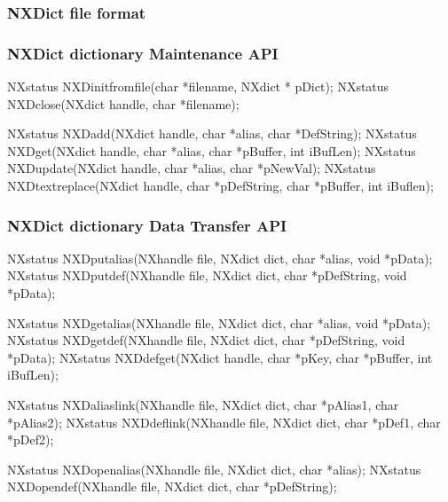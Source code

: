 \documentclass{beamer}
\begin{document}
\begin{frame}[fragile]
 \frametitle{NXDict file format }
\end{frame}


\begin{frame}[fragile]
 \frametitle{NXDict dictionary Maintenance API }
\begin{semiverbatim}
NXstatus NXDinitfromfile(char *filename, NXdict * pDict);
NXstatus NXDclose(NXdict handle, char *filename);

NXstatus NXDadd(NXdict handle, char *alias, char *DefString);
NXstatus NXDget(NXdict handle, char *alias, char *pBuffer, int iBufLen);
NXstatus NXDupdate(NXdict handle, char *alias, char *pNewVal);
NXstatus NXDtextreplace(NXdict handle, char *pDefString, char *pBuffer,
                        int iBuflen);
	
\end{semiverbatim}
\end{frame}



\begin{frame}[fragile]
 \frametitle{NXDict dictionary Data Transfer API }
\begin{semiverbatim}
NXstatus NXDputalias(NXhandle file, NXdict dict, char *alias, void *pData);
NXstatus NXDputdef(NXhandle file, NXdict dict, char *pDefString,
                   void *pData);

NXstatus NXDgetalias(NXhandle file, NXdict dict, char *alias, void *pData);
NXstatus NXDgetdef(NXhandle file, NXdict dict, char *pDefString,
                   void *pData);
NXstatus NXDdefget(NXdict handle, char *pKey, char *pBuffer, int iBufLen);

NXstatus NXDaliaslink(NXhandle file, NXdict dict,
                      char *pAlias1, char *pAlias2);
NXstatus NXDdeflink(NXhandle file, NXdict dict, char *pDef1, char *pDef2);

NXstatus NXDopenalias(NXhandle file, NXdict dict, char *alias);
NXstatus NXDopendef(NXhandle file, NXdict dict, char *pDefString);

\end{semiverbatim}
\end{frame}
\end{document}
